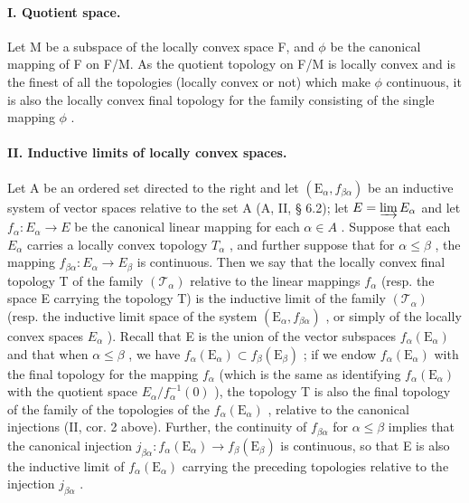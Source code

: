 \paragraph{I. Quotient space.}

Let M be a subspace of the locally convex space F, and \(\phi\) be the canonical mapping of F on F/M. As the quotient topology on F/M is locally convex and is the finest of all the topologies (locally convex or not) which make \(\phi\) continuous, it is also the locally convex final topology for the family consisting of the single mapping \(\phi\) .

\paragraph{II. Inductive limits of locally convex spaces.}

Let A be an ordered set directed to the right and let \((\mathrm{E}_{\alpha}, f_{\beta\alpha})\) be an inductive system of vector spaces relative to the set A (A, II, § 6.2); let \(E = \varinjlim E_{\alpha}\) and let \(f_{\alpha}: E_{\alpha} \to E\) be the canonical linear mapping for each \(\alpha \in A\) . Suppose that each \(E_{\alpha}\) carries a locally convex topology \(T_{\alpha}\) , and further suppose that for \(\alpha \leqslant \beta\) , the mapping \(f_{\beta\alpha}: E_{\alpha} \to E_{\beta}\) is continuous. Then we say that the locally convex final topology T of the family \((\mathcal{T}_{\alpha})\) relative to the linear mappings \(f_{\alpha}\) (resp. the space E carrying the topology T) is the inductive limit of the family \((\mathcal{T}_{\alpha})\) (resp. the inductive limit space of the system \((\mathrm{E}_{\alpha}, f_{\beta\alpha})\) , or simply of the locally convex spaces \(E_{\alpha}\) ). Recall that E is the union of the vector subspaces \(f_{\alpha}(\mathrm{E}_{\alpha})\) and that when \(\alpha \leqslant \beta\) , we have \(f_{\alpha}(\mathrm{E}_{\alpha}) \subset f_{\beta}(\mathrm{E}_{\beta})\) ; if we endow \(f_{\alpha}(\mathrm{E}_{\alpha})\) with the final topology for the mapping \(f_{\alpha}\) (which is the same as identifying \(f_{\alpha}(\mathrm{E}_{\alpha})\) with the quotient space \(E_{\alpha}/f_{\alpha}^{-1}(0)\) ), the topology T is also the final topology of the family of the topologies of the \(f_{\alpha}(\mathrm{E}_{\alpha})\) , relative to the canonical injections (II, cor. 2 above). Further, the continuity of \(f_{\beta\alpha}\) for \(\alpha \leqslant \beta\) implies that the canonical injection \(j_{\beta\alpha}: f_{\alpha}(\mathrm{E}_{\alpha}) \to f_{\beta}(\mathrm{E}_{\beta})\) is continuous, so that E is also the inductive limit of \(f_{\alpha}(\mathrm{E}_{\alpha})\) carrying the preceding topologies relative to the injection \(j_{\beta\alpha}\) .

